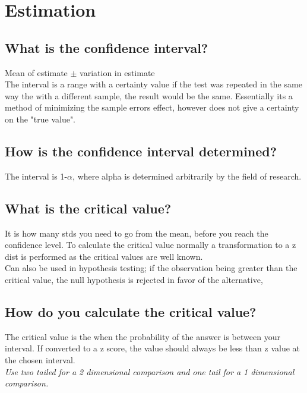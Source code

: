 \documentclass[11pt]{scrartcl} %
\begin{document}
\section{Estimation}

\subsection{What is the confidence interval?}

Mean of estimate \(\pm\) variation in estimate \\

The interval is a range with a certainty value if the test was repeated in the same way the with a different sample,
the result would be the same. Essentially its a method of minimizing the sample errors effect, however does not give
a certainty on the "true value". 

\subsection{How is the confidence interval determined?}

The interval is 1-\(\alpha\), where alpha is determined arbitrarily by the field of research.

\subsection{What is the critical value?}

It is how many stds you need to go from the mean, before you reach the confidence level. To calculate the critical value
normally a transformation to a z dist is performed as the critical values are well known. \\

Can also be used in hypothesis testing; if the observation being greater than the critical value,
the null hypothesis is rejected in favor of the alternative, 

\subsection{How do you calculate the critical value?}

The critical value is the when the probability of the answer is between your interval. If converted to a z score, the
value should always be less than z value at the chosen interval.\\

\textit{Use two tailed for a 2 dimensional comparison and one tail for a 1 dimensional comparison.}\\
\end{document}
